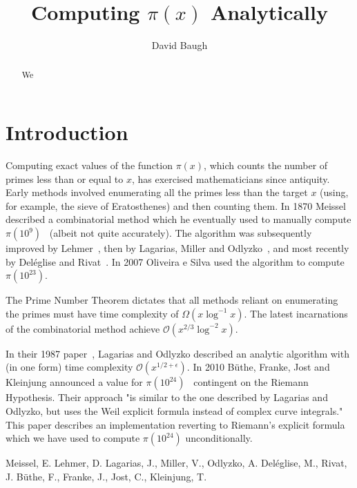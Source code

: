 \documentclass[12pt]{article}
\title{Computing $\pi(x)$ Analytically}
\author{David Baugh}
\date{}
\begin{document}
\maketitle

\begin{abstract}
    We 
\end{abstract}

\section{Introduction}

Computing exact values of the function $\pi(x)$, which counts the number of primes less than or equal to $x$, has exercised mathematicians since antiquity. Early methods involved enumerating all the primes less than the target $x$ (using, for example, the sieve of Eratosthenes) and then counting them. In 1870 Meissel~\cite{Meissel} described a combinatorial method which he eventually used to manually compute $\pi(10^9)$~\cite{Lehmer} (albeit not quite accurately). The algorithm was subsequently improved by Lehmer~\cite{Lehmer}, then by Lagarias, Miller and Odlyzko~\cite{Lagarias}, and most recently by Deléglise and Rivat~\cite{Deleglise}. In 2007 Oliveira e Silva used the algorithm to compute $\pi(10^{23})$.

The Prime Number Theorem dictates that all methods reliant on enumerating the primes must have time complexity of $\Omega(x\log^{-1} x)$. The latest incarnations of the combinatorial method achieve $\mathcal{O}(x^{2/3} \log^{-2} x)$.

In their 1987 paper~\cite{Lagarias}, Lagarias and Odlyzko described an analytic algorithm with (in one form) time complexity $\mathcal{O}(x^{1/2+\epsilon})$. In 2010 Büthe, Franke, Jost and Kleinjung announced a value for $\pi(10^{24})$~\cite{Buthe} contingent on the Riemann Hypothesis. Their approach "is similar to the one described by Lagarias and Odlyzko, but uses the Weil explicit formula instead of complex curve integrals." This paper describes an implementation reverting to Riemann’s explicit formula which we have used to compute $\pi(10^{24})$ unconditionally.

\begin{thebibliography}{99}
 Meissel, E.
 Lehmer, D.
 Lagarias, J., Miller, V., Odlyzko, A.
 Deléglise, M., Rivat, J.
 Büthe, F., Franke, J., Jost, C., Kleinjung, T.
\end{thebibliography}
\end{document}

